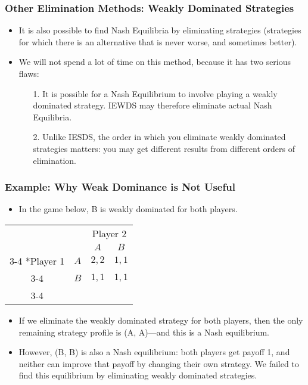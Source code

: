 \begin{frame}
\frametitle{Other Elimination Methods: Weakly Dominated Strategies}
\begin{itemize}
	\item It is also possible to find Nash Equilibria by eliminating  strategies (strategies for which there is an alternative that is never worse, and sometimes better).
	\item We will not spend a lot of time on this method, because it has two serious flaws:
	\begin{itemize}
		\item[1.] It is possible for a Nash Equilibrium to involve playing a weakly dominated strategy. IEWDS may therefore eliminate actual Nash Equilibria.
		\item[2.] Unlike IESDS, the order in which you eliminate weakly dominated strategies matters: you may get different results from different orders of elimination.
	\end{itemize}
\end{itemize}
\end{frame}

\begin{frame}
\frametitle{Example: Why Weak Dominance is Not Useful}
\begin{itemize}
\item In the game below, B is weakly dominated for both players.
\end{itemize}
\begin{table}[h]
\centering
\setlength{\extrarowheight}{2pt}
\begin{tabular}{cc|c|c|}
	& \multicolumn{1}{c}{} & \multicolumn{2}{c}{Player 2}\\
	& \multicolumn{1}{c}{} & \multicolumn{1}{c}{$A$}  & \multicolumn{1}{c}{$B$} \\\cline{3-4}
	\multirow{2}*{Player 1}  & $A$ & $2,2$ & $1,1$ \\\cline{3-4}
	& $B$ & $1,1$ & $1,1$ \\\cline{3-4}
\end{tabular}
\end{table}
\begin{itemize}
\item If we eliminate the weakly dominated strategy for both players, then the only remaining strategy profile is (A, A)---and this is a Nash equilibrium.
\item However, (B, B) is also a Nash equilibrium: both players get payoff 1, and neither can improve that payoff by changing their own strategy. We failed to find this equilibrium by eliminating weakly dominated strategies.
\end{itemize}
\end{frame}

